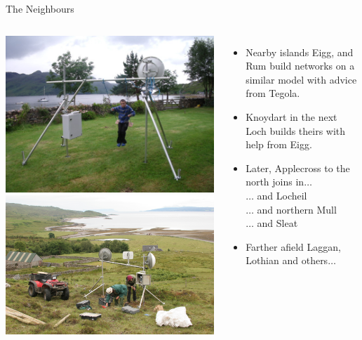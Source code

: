 \documentclass{beamer}
\begin{document}
\begin{frame}{The Neighbours}
  \begin{columns}
    \includegraphics[width=\textwidth]{corran-testing.jpg}\\
    \includegraphics[width=\textwidth]{inver-mast.jpg}\\
    \begin{itemize}
      \item Nearby islands \alert{Eigg}, and \alert{Rum} build
        networks on a similar model with advice from Tegola.
      \item \alert{Knoydart} in the next Loch builds theirs with help
        from Eigg.
      \item Later, \alert{Applecross} to the north joins in$\ldots$\\
        $\ldots$ and \alert{Locheil}\\
        $\ldots$ and northern \alert{Mull}\\
        $\ldots$ and \alert{Sleat}
      \item Farther afield \alert{Laggan}, \alert{Lothian} and
        others$\ldots$
    \end{itemize}
  \end{columns}
\end{frame}
\end{document}
